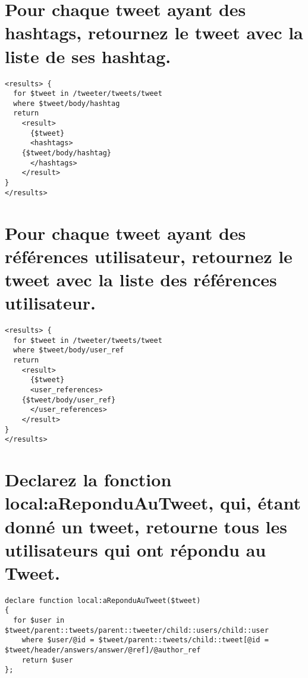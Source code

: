 \section{Pour chaque tweet ayant des hashtags, retournez le tweet avec la liste de ses hashtag.}
\begin{verbatim}
<results> {
  for $tweet in /tweeter/tweets/tweet
  where $tweet/body/hashtag
  return
    <result>
      {$tweet}
      <hashtags>
	{$tweet/body/hashtag}
      </hashtags>
    </result>
}
</results>
\end{verbatim}

\section{Pour chaque tweet ayant des références utilisateur, retournez le tweet avec la liste des références utilisateur.}
\begin{verbatim}
<results> {
  for $tweet in /tweeter/tweets/tweet
  where $tweet/body/user_ref
  return
    <result>
      {$tweet}
      <user_references>
	{$tweet/body/user_ref}
      </user_references>
    </result>
}
</results>
\end{verbatim}

\section{Declarez la fonction local:aReponduAuTweet, qui, étant donné un tweet, retourne tous les utilisateurs qui ont répondu au Tweet.}
\begin{verbatim}
declare function local:aReponduAuTweet($tweet)
{
  for $user in $tweet/parent::tweets/parent::tweeter/child::users/child::user
    where $user/@id = $tweet/parent::tweets/child::tweet[@id = $tweet/header/answers/answer/@ref]/@author_ref
    return $user
};
\end{verbatim}
